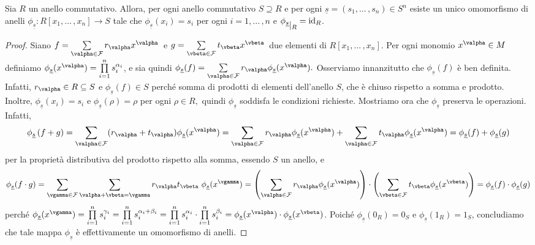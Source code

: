 \begin{teo}{}
Sia $R$ un anello commutativo. Allora, per ogni anello commutativo $S\supseteq R$ e per ogni $\underline{s}=(s_1,...\,,s_n)\in S^n$ esiste un unico omomorfismo di anelli $\phi_{\underline{s}}\colon R[x_1, ...\, ,x_n]\to S$ tale che $\phi_{\underline{s}} (x_i)=s_i$ per ogni $i=1,...\,,n$ e $\phi_{\underline{s}} \raisebox{-.5em}{$\vert_{R}$}= \operatorname{id}_R$.
\end{teo}
\vspace{-3.5mm}
\begin{proof}Siano $f=\sum\limits_{\valpha\in \mathcal{F}} r_{\valpha}x^{\valpha}\,$ e $g=\sum\limits_{\vbeta\in \mathcal{F}} t_{\vbeta}x^{\vbeta}\,$ due elementi di $R[x_1,...\,,x_n].$ Per ogni monomio $x^{\valpha}\in M$ definiamo $\phi_{\underline{s}}(x^{\valpha})=\prod\limits_{i=1}^n s_i^{\alpha_i}$, e sia quindi $\phi_{\underline{s}}(f)=\sum\limits_{\valpha\in \mathcal{F}} r_{\valpha}\phi_{\underline{s}}(x^{\valpha}).$ Osserviamo innanzitutto che $\phi_{\underline{s}}(f)$ è ben definita. Infatti, $r_{\valpha}\in R\subseteq S$ e $\phi_{\underline{s}}(f)\in S$ perché somma di prodotti di elementi dell'anello $S$, che è chiuso rispetto a somma e prodotto. Inoltre, $\phi_{\underline{s}}(x_i)=s_i$ e $\phi_{\underline{s}}(\rho)=\rho$ per ogni $\rho\in R,$ quindi $\phi_{\underline{s}}$ soddisfa le condizioni richieste. Mostriamo ora che $\phi_{\underline{s}}$ preserva le operazioni. Infatti, $$\phi_{\underline{s}}\left(f+g\right)=\sum\limits_{\valpha\in \mathcal{F}}(r_{\valpha}+t_{\valpha}) \phi_{\underline{s}}(x^{\valpha})=\sum\limits_{\valpha\in \mathcal{F}}r_{\valpha}\phi_{\underline{s}}(x^{\valpha})+\sum\limits_{\valpha\in \mathcal{F}}t_{\valpha} \phi_{\underline{s}}(x^{\valpha})=\phi_{\underline{s}}(f)+\phi_{\underline{s}}(g)$$ per la proprietà distributiva del prodotto rispetto alla somma, essendo $S$ un anello, e $$\phi_{\underline{s}}(f\cdot g)=\sum\limits_{\vgamma\in \mathcal{F}} \sum\limits_{\valpha+\vbeta=\vgamma} r_{\valpha}t_{\vbeta} \ \phi_{\underline{s}}(x^{\vgamma})=\left(\sum\limits_{\valpha\in \mathcal{F}} r_{\valpha}\phi_{\underline{s}}(x^{\valpha})\right)\cdot \left(\sum\limits_{\vbeta\in \mathcal{F}} t_{\vbeta}\phi_{\underline{s}}(x^{\vbeta})\right)=\phi_{\underline{s}}(f)\cdot \phi_{\underline{s}}(g)$$ perché $\phi_{\underline{s}}(x^{\vgamma})=\prod\limits_{i=1}^n s_i^{\gamma_i}=\prod\limits_{i=1}^n s_i^{\alpha_i+\beta_i}=\prod\limits_{i=1}^n s_i^{\alpha_i}\cdot \prod\limits_{i=1}^n s_i^{\beta_i}=\phi_{\underline{s}}(x^{\valpha})\cdot \phi_{\underline{s}}(x^{\vbeta})$. Poiché $\phi_{\underline{s}}(0_R)=0_S$ e $ \phi_{\underline{s}}(1_R)=1_S$, concludiamo che tale mappa $\phi_{\underline{s}}$ è effettivamente un omomorfismo di anelli.


\end{proof}
